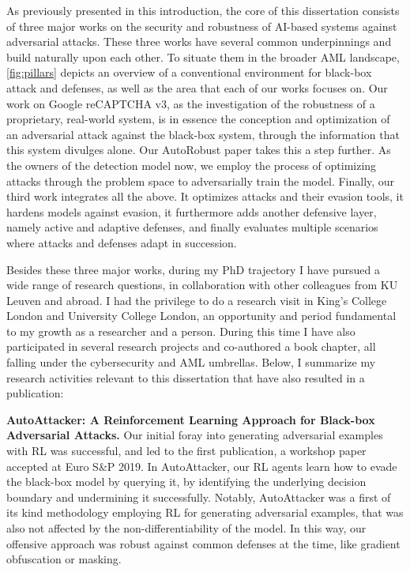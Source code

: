 As previously presented in this introduction, the core of this dissertation consists of three major works on the security and robustness of AI-based systems against adversarial attacks.
These three works have several common underpinnings and build naturally upon each other.
To situate them in the broader \gls{AML} landscape, \autoref{fig:pillars} depicts an overview of a conventional environment for black-box attack and defenses, as well as the area that each of our works focuses on.
Our work on Google reCAPTCHA v3, as the investigation of the robustness of a proprietary, real-world system, is in essence the conception and optimization of an adversarial attack against the black-box system, through the information that this system divulges alone.
Our AutoRobust paper takes this a step further.
As the owners of the detection model now, we employ the process of optimizing attacks through the problem space to adversarially train the model.
Finally, our third work integrates all the above.
It optimizes attacks and their evasion tools, it hardens models against evasion, it furthermore adds another defensive layer, namely active and adaptive defenses, and finally evaluates multiple scenarios where attacks and defenses adapt in succession.

Besides these three major works, during my PhD trajectory I have pursued a wide range of research questions, in collaboration with other colleagues from KU Leuven and abroad.
I had the privilege to do a research visit in King's College London and University College London, an opportunity and period fundamental to my growth as a researcher and a person.
During this time I have also participated in several research projects and co-authored a book chapter, all falling under the cybersecurity and \gls{AML} umbrellas.
Below, I summarize my research activities relevant to this dissertation that have also resulted in a publication:

\textbf{AutoAttacker: A Reinforcement Learning Approach for Black-box Adversarial Attacks.}
Our initial foray into generating adversarial examples with \gls{RL} was successful, and led to the first publication, a workshop paper accepted at Euro S\&P 2019.
In AutoAttacker, our \gls{RL} agents learn how to evade the black-box model by querying it, by identifying the underlying decision boundary and undermining it successfully.
Notably, AutoAttacker was a first of its kind methodology employing \gls{RL} for generating adversarial examples, that was also not affected by the non-differentiability of the model.
In this way, our offensive approach was robust against common defenses at the time, like gradient obfuscation or masking.

